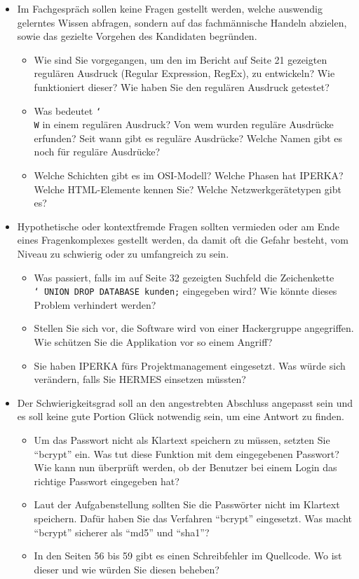 \begin{itemize}
  \item Im Fachgespräch sollen keine Fragen gestellt werden, welche auswendig gelerntes Wissen abfragen, sondern auf das fachmännische Handeln abzielen, sowie das gezielte Vorgehen des Kandidaten begründen.
  \begin{itemize}
    \item[\ding{51}] Wie sind Sie vorgegangen, um den im Bericht auf Seite 21 gezeigten regulären Ausdruck (Regular Expression, RegEx), zu entwickeln? Wie funktioniert dieser? Wie haben Sie den regulären Ausdruck getestet?
    \item[\ding{55}] Was bedeutet \texttt{\char`\\W} in einem regulären Ausdruck? Von wem wurden reguläre Ausdrücke erfunden? Seit wann gibt es reguläre Ausdrücke? Welche Namen gibt es noch für reguläre Ausdrücke?
    \item[\ding{55}] Welche Schichten gibt es im OSI-Modell? Welche Phasen hat IPERKA? Welche HTML-Elemente kennen Sie? Welche Netzwerkgerätetypen gibt es?
  \end{itemize}
  \item Hypothetische oder kontextfremde Fragen sollten vermieden oder am Ende eines Fragenkomplexes gestellt werden, da damit oft die Gefahr besteht, vom Niveau zu schwierig oder zu umfangreich zu sein.
  \begin{itemize}
    \item[\ding{51}] Was passiert, falls im auf Seite 32 gezeigten Suchfeld die Zeichenkette \texttt{\char`\"\ UNION DROP DATABASE kunden;} eingegeben wird? Wie könnte dieses Problem verhindert werden?
    \item[\ding{55}] Stellen Sie sich vor, die Software wird von einer Hackergruppe angegriffen. Wie schützen Sie die Applikation vor so einem Angriff?
    \item[\ding{55}] Sie haben IPERKA fürs Projektmanagement eingesetzt. Was würde sich verändern, falls Sie HERMES einsetzen müssten? 
  \end{itemize}
  \item Der Schwierigkeitsgrad soll an den angestrebten Abschluss angepasst sein und es soll keine gute Portion Glück notwendig sein, um eine Antwort zu finden.
  \begin{itemize}
    \item[\ding{51}] Um das Passwort nicht als Klartext speichern zu müssen, setzten Sie \enquote{bcrypt} ein. Was tut diese Funktion mit dem eingegebenen Passwort? Wie kann nun überprüft werden, ob der Benutzer bei einem Login das richtige Passwort eingegeben hat?
    \item[\ding{55}] Laut der Aufgabenstellung sollten Sie die Passwörter nicht im Klartext speichern. Dafür haben Sie das Verfahren \enquote{bcrypt} eingesetzt. Was macht \enquote{bcrypt} sicherer als \enquote{md5} und \enquote{sha1}?
    \item[\ding{55}] In den Seiten 56 bis 59 gibt es einen Schreibfehler im Quellcode. Wo ist dieser und wie würden Sie diesen beheben?
  \end{itemize}
\end{itemize}